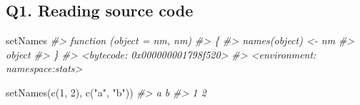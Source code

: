 \documentclass[
]{book}
\newenvironment{Shaded}{\begin{snugshade}}{\end{snugshade}}
\newcommand{\CommentTok}[1]{\textcolor[rgb]{0.56,0.35,0.01}{\textit{#1}}}
\newcommand{\DecValTok}[1]{\textcolor[rgb]{0.00,0.00,0.81}{#1}}
\newcommand{\FunctionTok}[1]{\textcolor[rgb]{0.00,0.00,0.00}{#1}}
\newcommand{\NormalTok}[1]{#1}
\newcommand{\StringTok}[1]{\textcolor[rgb]{0.31,0.60,0.02}{#1}}
\begin{document}
\hypertarget{q1.-reading-source-code}{%
\subsection*{Q1. Reading source code}\label{q1.-reading-source-code}}

\begin{Shaded}
\begin{Highlighting}[]
\NormalTok{setNames}
\CommentTok{\#\textgreater{} function (object = nm, nm) }
\CommentTok{\#\textgreater{} \{}
\CommentTok{\#\textgreater{}     names(object) \textless{}{-} nm}
\CommentTok{\#\textgreater{}     object}
\CommentTok{\#\textgreater{} \}}
\CommentTok{\#\textgreater{} \textless{}bytecode: 0x000000001798f520\textgreater{}}
\CommentTok{\#\textgreater{} \textless{}environment: namespace:stats\textgreater{}}

\FunctionTok{setNames}\NormalTok{(}\FunctionTok{c}\NormalTok{(}\DecValTok{1}\NormalTok{, }\DecValTok{2}\NormalTok{), }\FunctionTok{c}\NormalTok{(}\StringTok{"a"}\NormalTok{, }\StringTok{"b"}\NormalTok{))}
\CommentTok{\#\textgreater{} a b }
\CommentTok{\#\textgreater{} 1 2}
\end{Highlighting}
\end{Shaded}
\end{document}
